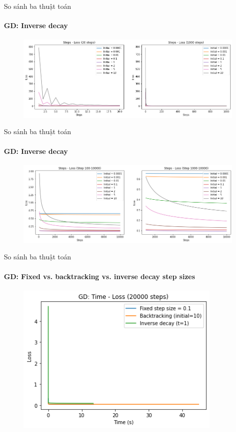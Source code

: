 \documentclass[10pt]{beamer}
\theoremstyle{remark}
\theoremstyle{definition}
\begin{document}
\begin{frame}{So sánh ba thuật toán}
	\framesubtitle{GD: Inverse decay}
	\begin{figure}[h!]
		\centering
		\includegraphics[width=12cm]{Thinh/7.png}
	\end{figure}
\end{frame}

\begin{frame}{So sánh ba thuật toán}
	\framesubtitle{GD: Inverse decay}

	\begin{figure}[h!]
		\centering
		\includegraphics[width=12cm]{Thinh/8.png}
	\end{figure}
\end{frame}

\begin{frame}{So sánh ba thuật toán}
	\framesubtitle{GD: Fixed vs. backtracking vs. inverse decay step sizes}
	\begin{figure}[h!]
		\centering
		\includegraphics[width=10cm]{Thinh/9.png}
	\end{figure}

\end{frame}
\end{document}
